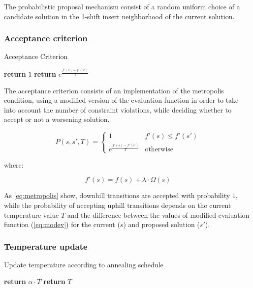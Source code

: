 \begin{homeworkProblem}
The probabilistic proposal mechanism consist of a random uniform choice of a candidate solution in the 1-shift insert neighborhood of the current solution.

\subsubsection{Acceptance criterion}
\begin{algorithm}
\caption{Acceptance Criterion}
\label{saTSPTW}
\begin{algorithmic}
  \State \textbf{return} $1$
\Else
  \State \textbf{return} $e^{\frac{f'(s)-f'(s')}{T}}$
\EndIf
\EndProcedure
\end{algorithmic}
\end{algorithm}

The acceptance criterion consists of an implementation of the metropolis condition, using a modified version of the evaluation function in order to take into account the number of constraint violations, while deciding whether to accept or not a worsening solution.

\begin{equation} \label{eq:metropolis}
  P(s,s',T) = \begin{cases}
               1 & f'(s) \le f'(s') \\
               e^{\frac{f'(s)-f'(s')}{T}} & \text{otherwise}
              \end{cases}
\end{equation}

where:

\begin{equation} \label{eq:modev}
  f'(s) = f(s) + \lambda \cdot \Omega(s)
\end{equation}

As \ref{eq:metropolis} show, downhill transitions are accepted with probability $1$, while the probability of accepting uphill transitions depends on the current temperature value $T$ and the difference between the values of modified evaluation function (\ref{eq:modev}) for the current ($s$) and proposed solution ($s'$).


\subsubsection{Temperature update}
\begin{algorithm}[H]
\caption{Update temperature according to annealing schedule}
\label{saTSPTW}
\begin{algorithmic}
    \State \textbf{return} $\alpha \cdot T$
  \Else
    \State \textbf{return} $T$
  \EndIf
\EndProcedure
\end{algorithmic}
\end{algorithm}


\end{homeworkProblem}
